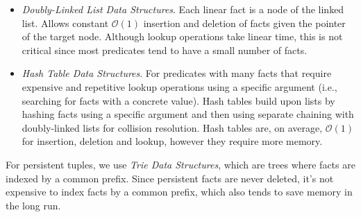 \begin{itemize}
   \item \emph{Doubly-Linked List Data Structures}. Each linear fact is a node
   of the linked list. Allows constant
   $\mathcal{O}(1)$ insertion and deletion of facts given the pointer of the
   target node. Although lookup operations take linear time, this is not
   critical since most predicates tend to have a small number of facts.
   \item \emph{Hash Table Data Structures}. For predicates with many facts that
   require expensive and repetitive lookup operations using a specific argument
   (i.e., searching for facts with a concrete value).
   Hash tables build upon lists by hashing facts using a specific argument and
   then using separate chaining with doubly-linked lists for collision
   resolution. Hash tables are, on average, $\mathcal{O}(1)$ for insertion,
   deletion and lookup, however they require more memory.
\end{itemize}

For persistent tuples, we use \emph{Trie Data Structures}, which are trees where
facts are indexed by a common prefix. Since persistent facts are never deleted,
it's not expensive to index facts by a common prefix, which also tends to save
memory in the long run.
